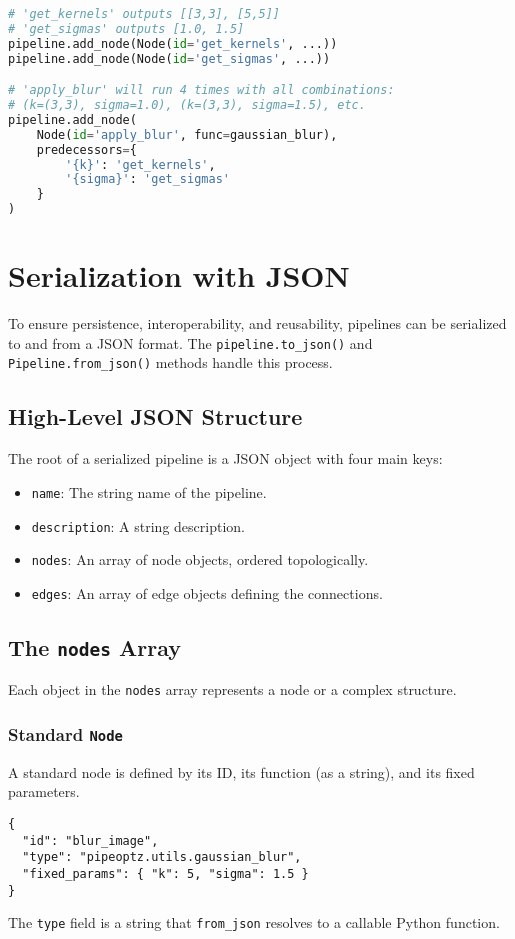 \documentclass[12pt]{article}
\begin{document}
\begin{lstlisting}[language=python, caption={Combinatorial execution}]
# 'get_kernels' outputs [[3,3], [5,5]]
# 'get_sigmas' outputs [1.0, 1.5]
pipeline.add_node(Node(id='get_kernels', ...))
pipeline.add_node(Node(id='get_sigmas', ...))

# 'apply_blur' will run 4 times with all combinations:
# (k=(3,3), sigma=1.0), (k=(3,3), sigma=1.5), etc.
pipeline.add_node(
    Node(id='apply_blur', func=gaussian_blur),
    predecessors={
        '{k}': 'get_kernels',
        '{sigma}': 'get_sigmas'
    }
)
\end{lstlisting}

\newpage
\section{Serialization with JSON}
To ensure persistence, interoperability, and reusability, pipelines can be serialized to and from a JSON format. The \texttt{pipeline.to\_json()} and \texttt{Pipeline.from\_json()} methods handle this process.

\subsection{High-Level JSON Structure}
The root of a serialized pipeline is a JSON object with four main keys:
\begin{itemize}
    \item \texttt{name}: The string name of the pipeline.
    \item \texttt{description}: A string description.
    \item \texttt{nodes}: An array of node objects, ordered topologically.
    \item \texttt{edges}: An array of edge objects defining the connections.
\end{itemize}

\subsection{The \texttt{nodes} Array}
Each object in the \texttt{nodes} array represents a node or a complex structure.

\subsubsection{Standard \texttt{Node}}
A standard node is defined by its ID, its function (as a string), and its fixed parameters.
\begin{lstlisting}[caption={JSON for a standard Node}]
{
  "id": "blur_image",
  "type": "pipeoptz.utils.gaussian_blur",
  "fixed_params": { "k": 5, "sigma": 1.5 }
}
\end{lstlisting}
The \texttt{type} field is a string that \texttt{from\_json} resolves to a callable Python function.
\end{document}
